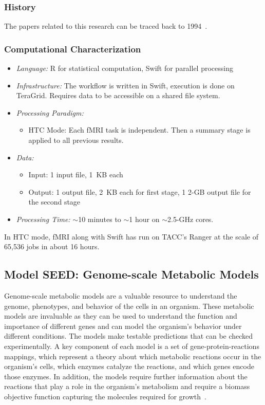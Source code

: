 \documentclass[10pt,letterpaper]{article}
\begin{document}
\subsubsection{History}
The papers related to this research can be traced back to 1994~\cite{fMRI-1994, fMRI-1995}.

\subsubsection{Computational Characterization}
\begin {itemize}
\item {\em Language:} R for statistical computation, Swift for parallel processing
\item {\em Infrastructure:} The workflow is written in Swift, execution is done on TeraGrid. Requires  data to be accessible on a shared file system.
\item {\em Processing Paradigm:}
  \begin{itemize}
  \item HTC Mode: Each fMRI task is independent. Then a summary stage is applied to all previous results.
  \end{itemize}

\item {\em Data:}
  \begin{itemize}
  \item Input: 1 input file, 1~KB each
  \item Output: 1 output file, 2~KB each for first stage, 1 2-GB output file for the second stage
  \end{itemize}

\item {\em Processing Time:} $\sim$10 minutes to $\sim$1 hour on $\sim$2.5-GHz cores.
\end{itemize}

 In HTC mode, fMRI along with Swift has run on TACC's Ranger at the scale of 65,536 jobs in about 16 hours.

\subsection{Model SEED: Genome-scale Metabolic Models}

Genome-scale metabolic models are a valuable resource to understand
the genome, phenotypes, and behavior of the cells in an organism.  These metabolic models
are invaluable as they can be used to understand the function and importance
of different genes and can model the organism's behavior under different
conditions.  The models make testable predictions that can
be checked experimentally.  A key
component of each model is a set of gene-protein-reactions mappings, which
represent a theory about which metabolic reactions occur in the
organism's cells, which enzymes catalyze the reactions, and which genes
encode those enzymes.  In addition, the models 
require further information about the reactions that play a role in the
organism's metabolism and require a biomass objective function capturing
the molecules required for growth~\cite{henry-09}.
\end{document}
